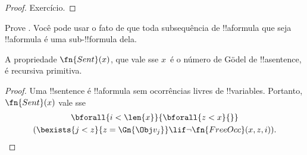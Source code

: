 \documentclass[../../../include/open-logic-section]{subfiles}
\begin{document}
\begin{proof}
Exercício.
\end{proof}

\begin{prob}
Prove . Você pode usar o
fato de que toda subsequência de !!a{formula} que seja !!a{formula} é
uma sub-!!{formula} dela.
\end{prob}

\begin{prop}
A propriedade $\fn{Sent}(x)$, que vale sse $x$~é o número de G\"odel
de !!a{sentence}, é recursiva primitiva.
\end{prop}

\begin{proof}
Uma !!{sentence} é !!a{formula} sem ocorrências livres de
!!{variable}s. Portanto, $\fn{Sent}(x)$ vale sse
\begin{multline*}
\bforall{i<\len{x}}{\bforall{z<x}{}}\\
(\bexists{j<z}{z=\Gn{\Obj v_j}} \lif \lnot\fn{FreeOcc}(x,z,i)).
\end{multline*}
\end{proof}
\end{document}
